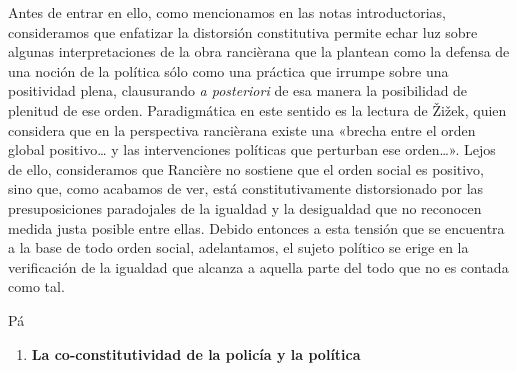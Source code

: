 Antes de entrar en ello, como mencionamos en las notas introductorias, consideramos que enfatizar la distorsión constitutiva permite echar luz sobre algunas interpretaciones de la obra rancièrana que la plantean como la defensa de una noción de la política sólo como una práctica que irrumpe sobre una positividad plena, clausurando \emph{a posteriori} de esa manera la posibilidad de plenitud de ese orden. Paradigmática en este sentido es la lectura de Žižek, quien considera que en la perspectiva rancièrana existe una «brecha entre el orden global positivo\ldots{} y las intervenciones políticas que perturban ese orden\ldots». Lejos de ello, consideramos que Rancière no sostiene que el orden social es positivo, sino que, como acabamos de ver, está constitutivamente distorsionado por las presuposiciones paradojales de la igualdad y la desigualdad que no reconocen medida justa posible entre ellas. Debido entonces a esta tensión que se encuentra a la base de todo orden social, adelantamos, el sujeto político se erige en la verificación de la igualdad que alcanza a aquella parte del todo que no es contada como tal.

Pá

\begin{enumerate}
\def\labelenumi{\arabic{enumi}.}
\item
  \textbf{La co-constitutividad de la policía y la política}
\end{enumerate}

